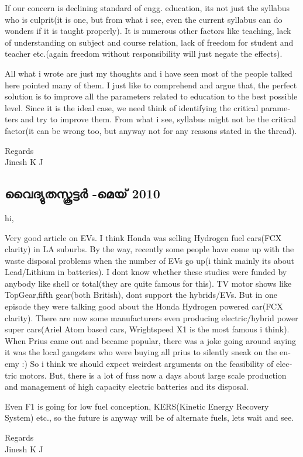 \begin{english}
If our concern is declining standard of engg. education, its not just the syllabus who is culprit(it is one, but from what i see, even the current syllabus can do wonders if it is taught properly). It is numerous other factors like teaching, lack of understanding on subject and course relation, lack of freedom for student and teacher etc.(again freedom without responsibility will just negate the effects).

All what i wrote are just my thoughts and i have seen most of the people talked here pointed many of them. I just like to comprehend and argue that, the perfect solution is to improve all the parameters related to education to the best possible level. Since it is the ideal case, we need think of identifying the critical parameters and try to improve them. From what i see, syllabus might not be the critical factor(it can be wrong too, but anyway not for any reasons stated in the thread).


Regards\\
Jinesh K J
\end{english}

\subsection*{വൈദ്യുതസ്കൂട്ടര്‍  -മെയ് 2010}

\begin{english}
hi,

Very good article on EVs. I think Honda was selling Hydrogen fuel
cars(FCX clarity) in LA suburbs.
By the way, recently some people have come up with the waste disposal
problems when the number of EVs go up(i think mainly its about
Lead/Lithium in batteries). I dont know whether these studies were
funded by anybody like shell or total(they are quite famous for this).
TV motor shows like TopGear,fifth gear(both British), dont support the
hybrids/EVs. But in one episode they were talking good about the Honda
Hydrogen powered car(FCX clarity). There are now some manufacturers
even producing electric/hybrid power super cars(Ariel Atom based cars,
Wrightspeed X1 is the most famous i think). When Prius came out and
became popular, there was a joke going around saying it was the local
gangsters who were buying all prius to silently sneak on the enemy :)
So i think we should expect weirdest arguments on the feasibility of
electric motors. But, there is a lot of fuss now a days about large
scale production and management of high capacity electric batteries
and its disposal.

Even F1 is going for low fuel conception, KERS(Kinetic Energy Recovery
System) etc., so the future is anyway will be of alternate fuels, lets
wait and see.

Regards\\
Jinesh K J
\end{english}

